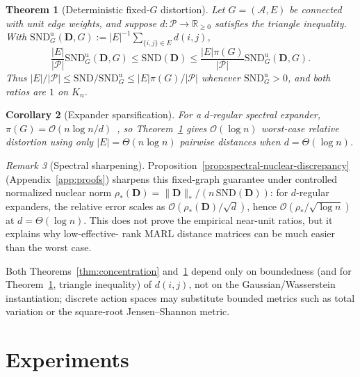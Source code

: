 \documentclass{article}
\theoremstyle{plain}
\newtheorem{theorem}{Theorem}
\newtheorem{corollary}[theorem]{Corollary}
\theoremstyle{definition}
\theoremstyle{remark}
\newtheorem{remark}[theorem]{Remark}
\newcommand{\R}{\mathbb{R}}
\newcommand{\Agents}{\mathcal{A}}        %
\newcommand{\Pairs}{\mathcal{P}}         %
\newcommand{\SND}{\ensuremath{\mathrm{SND}}}
\newcommand{\SNDG}{\mathrm{SND}_{G}}
\begin{document}
\begin{theorem}[Deterministic fixed-$G$ distortion]
\label{thm:distortion}
Let $G=(\Agents,E)$ be connected with unit edge weights, and suppose
$d:\Pairs\to\R_{\ge0}$ satisfies the triangle inequality. With
$\SNDG^{\mathrm{u}}(\mathbf{D},G):=|E|^{-1}\sum_{\{i,j\}\in E}d(i,j)$,
\begin{equation}
\label{eq:distortion}
\frac{|E|}{|\Pairs|}\SNDG^{\mathrm{u}}(\mathbf{D},G)
\leq \SND(\mathbf{D})
\leq
\frac{|E|\pi(G)}{|\Pairs|}\SNDG^{\mathrm{u}}(\mathbf{D},G).
\end{equation}
Thus $|E|/|\Pairs|\leq\SND/\SNDG^{\mathrm{u}}\leq|E|\pi(G)/|\Pairs|$
whenever $\SNDG^{\mathrm{u}}>0$, and both ratios are $1$ on $K_n$.
\end{theorem}

\begin{corollary}[Expander sparsification]
\label{cor:expander-distortion}
For a $d$-regular spectral expander,
$\pi(G)=\mathcal{O}(n\log n/d)$~\citep{leighton1999multicommodity}, so
Theorem~\ref{thm:distortion} gives $\mathcal{O}(\log n)$ worst-case
relative distortion using only $|E|=\Theta(n\log n)$ pairwise distances
when $d=\Theta(\log n)$.
\end{corollary}

\begin{remark}[Spectral sharpening]
\label{rem:main-spectral-sharpening}
Proposition~\ref{prop:spectral-nuclear-discrepancy} (Appendix~\ref{app:proofs})
sharpens this fixed-graph guarantee under controlled normalized nuclear
norm $\rho_*(\mathbf{D})=\|\mathbf{D}\|_*/(n\,\SND(\mathbf{D}))$: for
$d$-regular expanders, the relative error scales as
$\mathcal{O}(\rho_*(\mathbf{D})/\sqrt d)$, hence
$\mathcal{O}(\rho_*/\sqrt{\log n})$ at $d=\Theta(\log n)$. This does not
prove the empirical near-unit ratios, but it explains why low-effective-
rank MARL distance matrices can be much easier than the worst case.
\end{remark}

Both Theorems~\ref{thm:concentration} and~\ref{thm:distortion} depend
only on boundedness (and for Theorem~\ref{thm:distortion}, triangle
inequality) of $d(i,j)$, not on the Gaussian/Wasserstein instantiation;
discrete action spaces may substitute bounded metrics such as total
variation or the square-root Jensen--Shannon metric.

\section{Experiments}
\label{sec:experiments}
\end{document}
